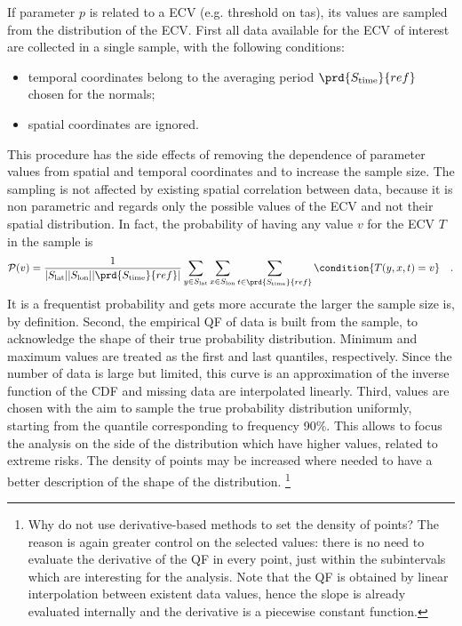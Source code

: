 If parameter $p$ is related to a \gls{ECV} (e.g. threshold on \gls{tas}), its values are sampled from the distribution of the \gls{ECV}. First all data available for the \gls{ECV} of interest are collected in a single sample, with the following conditions:
\begin{itemize}
  \item temporal coordinates belong to the averaging period $\prd{S_\text{time}}{ref}$ chosen for the \glspl{normal};
  \item spatial coordinates are ignored.
\end{itemize}
This procedure has the side effects of removing the dependence of parameter values from spatial and temporal coordinates and to increase the sample size. The sampling is not affected by existing spatial correlation between data, because it is non parametric and regards only the possible values of the \gls{ECV} and not their spatial distribution. In fact, the probability of having any value $v$ for the \gls{ECV} $T$ in the sample is
\begin{equation}
  \label{eq:variable_probability}
  \mathcal{P}(v) = \frac{1}{\abs{S_\text{lat}} \abs{S_\text{lon}} \abs{\prd{S_\text{time}}{ref}}} \sum_{y \in S_\text{lat}} \sum_{x \in S_\text{lon}} \sum_{t \in \prd{S_\text{time}}{ref}} \condition{T(y, x, t) = v}
  \quad .
\end{equation}
It is a frequentist probability and gets more accurate the larger the sample size is, by definition. %
Second, the empirical \gls{QF} of data is built from the sample, to acknowledge the shape of their true probability distribution. Minimum and maximum values are treated as the first and last quantiles, respectively. Since the number of data is large but limited, this curve is an approximation of the inverse function of the \gls{CDF} and missing data are interpolated linearly.
Third, values are chosen with the aim to sample the true probability distribution uniformly, starting from the quantile corresponding to frequency 90\%. This allows to focus the analysis on the side of the distribution which have higher values, related to extreme \glspl{risk}. The density of points may be increased where needed to have a better description of the shape of the distribution.%
\footnote{Why do not use derivative-based methods to set the density of points? The reason is again greater control on the selected values: there is no need to evaluate the derivative of the \gls{QF} in every point, just within the subintervals which are interesting for the analysis. Note that the \gls{QF} is obtained by linear interpolation between existent data values, hence the slope is already evaluated internally and the derivative is a piecewise constant function.}

